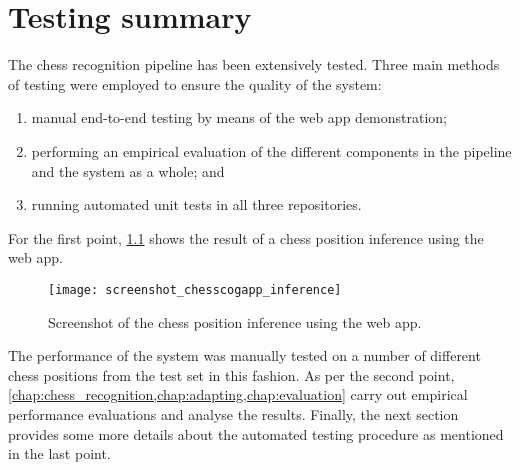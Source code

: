 \documentclass[../../report.tex]{subfiles}
\begin{document}
\chapter{Testing summary}
The chess recognition pipeline has been extensively tested. 
Three main methods of testing were employed to ensure the quality of the system: 
\begin{enumerate}
    \item manual end-to-end testing by means of the web app demonstration;
    \item performing an empirical evaluation of the different components in the pipeline and the system as a whole; and
    \item running automated unit tests in all three repositories.
\end{enumerate}
For the first point, \cref{fig:chesscogapp_inference} shows the result of a chess position inference using the web app.
\begin{figure}
    \centering
    \texttt{[image: screenshot\_chesscogapp\_inference]}
    \caption{Screenshot of the chess position inference using the web app.}
    \label{fig:chesscogapp_inference}
\end{figure}
The performance of the system was manually tested on a number of different chess positions from the test set in this fashion.
As per the second point, \cref{chap:chess_recognition,chap:adapting,chap:evaluation} carry out empirical performance evaluations and analyse the results.
Finally, the next section provides some more details about the automated testing procedure as mentioned in the last point.
\end{document}
